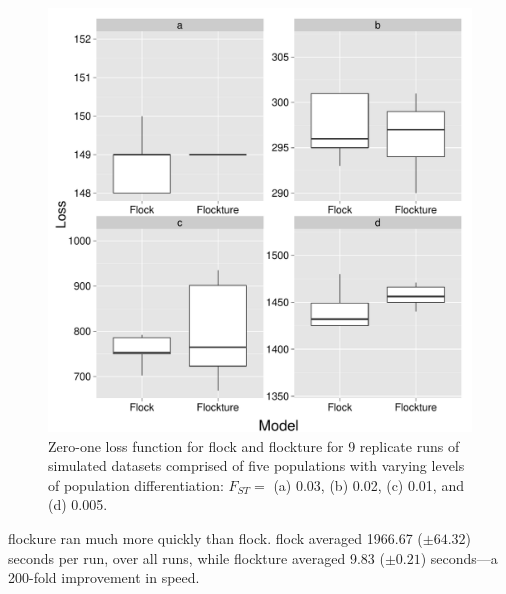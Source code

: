 \begin{figure}
\begin{center}
  \includegraphics[width=.9\linewidth]{images/Figures-Pat/FlockvFlocktureLoss.pdf}
  \caption{Zero-one loss function for {\sc flock} and {\sc flockture} for 9 replicate 
  runs of simulated datasets comprised of five populations with varying
  levels of population differentiation:  $F_{ST} = $ (a) 0.03, (b) 0.02, (c) 0.01, and (d) 0.005.}
  \label{fig:FvFloss}
\end{center}
\end{figure}

{\sc flockure} ran much more quickly than {\sc flock}.  {\sc flock} 
averaged 1966.67 ($\pm 64.32$) seconds per run,
over all runs, while {\sc flockture} averaged 9.83 ($\pm 0.21$) seconds---a 200-fold improvement in 
speed. 

